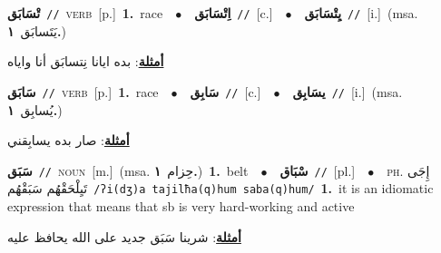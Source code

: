 \documentclass[10pt,a4paper,twoside]{article} %
\begin{document}
\begin{multicols}{2}
{\setlength\topsep{0pt}\textbf{\foreignlanguage{arabic}{تْسَابَق}}\ {\color{gray}\texttt{//}\color{black}}\ \textsc{verb}\ [p.]\ \textbf{1.}~race\ \ $\bullet$\ \ \setlength\topsep{0pt}\textbf{\foreignlanguage{arabic}{اِتْسَابَق}}\ {\color{gray}\texttt{//}\color{black}}\ [c.]\ \ $\bullet$\ \ \setlength\topsep{0pt}\textbf{\foreignlanguage{arabic}{يِتْسَابَق}}\ {\color{gray}\texttt{//}\color{black}}\ [i.]\ \color{gray}(msa. \foreignlanguage{arabic}{يَتَسابَق}~\foreignlanguage{arabic}{\textbf{١.}})\color{black}\  \begin{flushright}\color{gray}\foreignlanguage{arabic}{\textbf{\underline{\foreignlanguage{arabic}{أمثلة}}}: بده ايانا نِتسابَق أنا واياه}\end{flushright}\color{black}} \vspace{2mm}

{\setlength\topsep{0pt}\textbf{\foreignlanguage{arabic}{سَابَق}}\ {\color{gray}\texttt{//}\color{black}}\ \textsc{verb}\ [p.]\ \textbf{1.}~race\ \ $\bullet$\ \ \setlength\topsep{0pt}\textbf{\foreignlanguage{arabic}{سَابِق}}\ {\color{gray}\texttt{//}\color{black}}\ [c.]\ \ $\bullet$\ \ \setlength\topsep{0pt}\textbf{\foreignlanguage{arabic}{يسَابِق}}\ {\color{gray}\texttt{//}\color{black}}\ [i.]\ \color{gray}(msa. \foreignlanguage{arabic}{يُسابِق}~\foreignlanguage{arabic}{\textbf{١.}})\color{black}\  \begin{flushright}\color{gray}\foreignlanguage{arabic}{\textbf{\underline{\foreignlanguage{arabic}{أمثلة}}}: صار بده يسابِقني}\end{flushright}\color{black}} \vspace{2mm}

{\setlength\topsep{0pt}\textbf{\foreignlanguage{arabic}{سَبَق}}\ {\color{gray}\texttt{//}\color{black}}\ \textsc{noun}\ [m.]\ \color{gray}(msa. \foreignlanguage{arabic}{حِزام}~\foreignlanguage{arabic}{\textbf{١.}})\color{black}\ \textbf{1.}~belt\ \ $\bullet$\ \ \setlength\topsep{0pt}\textbf{\foreignlanguage{arabic}{سْبَاق}}\ {\color{gray}\texttt{//}\color{black}}\ [pl.]\ \ $\bullet$\ \ \textsc{ph.} \color{gray} \foreignlanguage{arabic}{إِجَى تَيِلْحَقْهُم سَبَقْهُم}\color{black}\ {\color{gray}\texttt{/{\sffamily ʔi(dʒ)a tajilħa(q)hum saba(q)hum}/}\color{black}}\ \textbf{1.}~it is an idiomatic expression that means that sb is very hard-working and active\  \begin{flushright}\color{gray}\foreignlanguage{arabic}{\textbf{\underline{\foreignlanguage{arabic}{أمثلة}}}: شرينا سَبَق جديد على الله يحافظ عليه}\end{flushright}\color{black}} \vspace{2mm}


\end{multicols}
\end{document}
